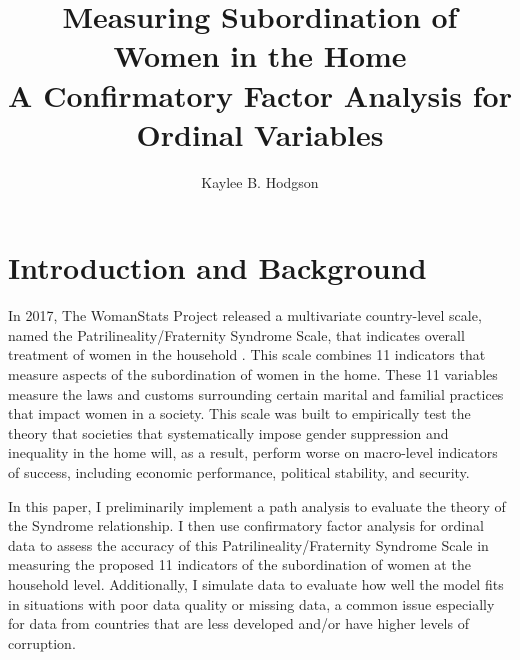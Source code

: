 \documentclass[letterpaper,11pt]{article}
\begin{document}
\title{Measuring Subordination of Women in the Home \\
      \large{A Confirmatory Factor Analysis for Ordinal Variables}}
\author{Kaylee B. Hodgson} 

\maketitle


\section{Introduction and Background}

In 2017, The WomanStats Project released a multivariate country-level scale, named the Patrilineality/Fraternity Syndrome Scale, that indicates overall treatment of women in the household \cite{womanstats}. This scale combines 11 indicators that measure aspects of the subordination of women in the home. These 11 variables measure the laws and customs surrounding certain marital and familial practices that impact women in a society. This scale was built to empirically test the theory that societies that systematically impose gender suppression and inequality in the home will, as a result, perform worse on macro-level indicators of success, including economic performance, political stability, and security. 

In this paper, I preliminarily implement a path analysis to evaluate the theory of the Syndrome relationship. I then use confirmatory factor analysis for ordinal data to assess the accuracy of this Patrilineality/Fraternity Syndrome Scale in measuring the proposed 11 indicators of the subordination of women at the household level. Additionally, I simulate data to evaluate how well the model fits in situations with poor data quality or missing data, a common issue especially for data from countries that are less developed and/or have higher levels of corruption. 
\end{document}
